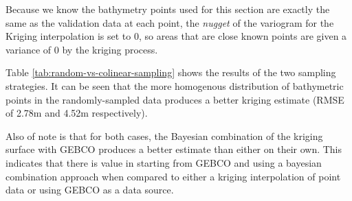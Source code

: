 Because we know the bathymetry points used for this section are exactly the same as the validation data at each point, the \emph{nugget} of the variogram for the Kriging interpolation is set to $0$, so areas that are close known points are given a variance of $0$ by the kriging process. 


Table \ref{tab:random-vs-colinear-sampling} shows the results of the two sampling strategies. It can be seen that the more homogenous distribution of bathymetric points in the randomly-sampled data produces a better kriging estimate (RMSE of 2.78m and 4.52m respectively). 

Also of note is that for both cases, the Bayesian combination of the kriging surface with GEBCO produces a better estimate than either on their own. This indicates that there is value in starting from GEBCO and using a bayesian combination approach when compared to either a kriging interpolation of point data or using GEBCO as a data source.




